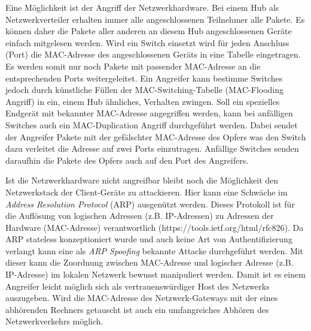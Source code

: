 Eine Möglichkeit ist der Angriff der Netzwerkhardware. Bei einem Hub als Netzwerkverteiler erhalten immer alle angeschlossenen Teilnehmer alle Pakete. Es können daher die Pakete aller anderen an diesem Hub angeschlossenen Geräte einfach mitgelesen werden. Wird ein Switch einsetzt wird für jeden Anschluss (Port) die MAC-Adresse des angeschlossenen Geräts in eine Tabelle eingetragen. Es werden somit nur noch Pakete mit passender MAC-Adresse an die entsprechenden Ports weitergeleitet. Ein Angreifer kann bestimme Switches jedoch durch künstliche Füllen der MAC-Switching-Tabelle (MAC-Flooding Angriff) in ein, einem Hub ähnliches, Verhalten zwingen. Soll ein spezielles Endgerät mit bekannter MAC-Adresse angegriffen werden, kann bei anfälligen Switches auch ein MAC-Duplication Angriff durchgeführt werden. Dabei sendet der Angreifer Pakete mit der gefälschter MAC-Adresse des Opfers was den Switch dazu verleitet die Adresse auf zwei Ports einzutragen. Anfällige Switches senden daraufhin die Pakete des Opfers auch auf den Port des Angreifers.

Ist die Netzwerkhardware nicht angreifbar bleibt noch die Möglichkeit den Netzwerkstack der Client-Geräte zu attackieren. Hier kann eine Schwäche im \textit{Address Resolution Protocol} (ARP) ausgenützt werden. Dieses Protokoll ist für die Auflösung von logischen Adressen (z.B. IP-Adressen) zu Adressen der Hardware (MAC-Adresse) verantwortlich (https://tools.ietf.org/html/rfc826). Da ARP stateless konzeptioniert wurde und auch keine Art von Authentifizierung verlangt kann eine als \textit{ARP Spoofing} bekannte Attacke durchgeführt werden. Mit dieser kann die Zuordnung zwischen MAC-Adresse und logischer Adresse (z.B. IP-Adresse) im lokalen Netzwerk bewusst manipuliert werden. Damit ist es einem Angreifer leicht möglich sich als vertrauenswürdiger Host des Netzwerks auszugeben. Wird die MAC-Adresse des Netzwerk-Gateways mit der eines abhörenden Rechners getauscht ist auch ein umfangreiches Abhören des Netzwerkverkehrs möglich.


